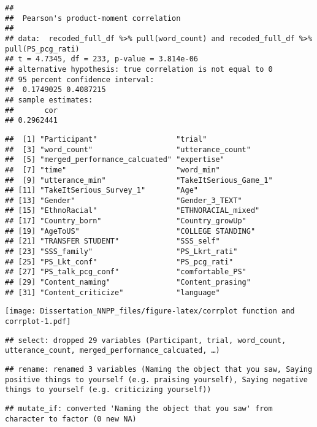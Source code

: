\documentclass[
]{article}
\begin{document}
\begin{verbatim}
## 
##  Pearson's product-moment correlation
## 
## data:  recoded_full_df %>% pull(word_count) and recoded_full_df %>% pull(PS_pcg_rati)
## t = 4.7345, df = 233, p-value = 3.814e-06
## alternative hypothesis: true correlation is not equal to 0
## 95 percent confidence interval:
##  0.1749025 0.4087215
## sample estimates:
##       cor 
## 0.2962441
\end{verbatim}

\begin{verbatim}
##  [1] "Participant"                  "trial"                       
##  [3] "word_count"                   "utterance_count"             
##  [5] "merged_performance_calcuated" "expertise"                   
##  [7] "time"                         "word_min"                    
##  [9] "utterance_min"                "TakeItSerious_Game_1"        
## [11] "TakeItSerious_Survey_1"       "Age"                         
## [13] "Gender"                       "Gender_3_TEXT"               
## [15] "EthnoRacial"                  "ETHNORACIAL_mixed"           
## [17] "Country_born"                 "Country_growUp"              
## [19] "AgeToUS"                      "COLLEGE STANDING"            
## [21] "TRANSFER STUDENT"             "SSS_self"                    
## [23] "SSS_family"                   "PS_Lkrt_rati"                
## [25] "PS_Lkt_conf"                  "PS_pcg_rati"                 
## [27] "PS_talk_pcg_conf"             "comfortable_PS"              
## [29] "Content_naming"               "Content_prasing"             
## [31] "Content_criticize"            "language"
\end{verbatim}

\texttt{[image: Dissertation\_NNPP\_files/figure-latex/corrplot function and corrplot-1.pdf]}

\begin{verbatim}
## select: dropped 29 variables (Participant, trial, word_count, utterance_count, merged_performance_calcuated, …)
\end{verbatim}

\begin{verbatim}
## rename: renamed 3 variables (Naming the object that you saw, Saying positive things to yourself (e.g. praising yourself), Saying negative things to yourself (e.g. criticizing yourself))
\end{verbatim}

\begin{verbatim}
## mutate_if: converted 'Naming the object that you saw' from character to factor (0 new NA)
\end{verbatim}
\end{document}
